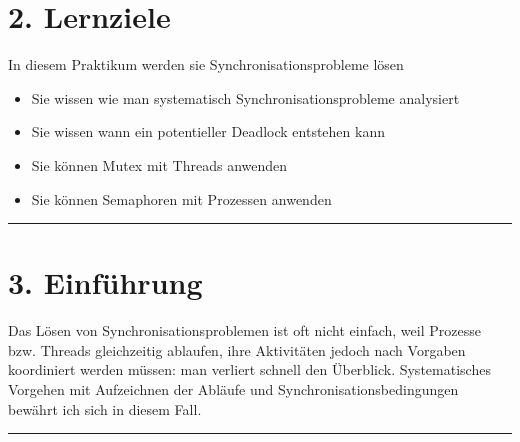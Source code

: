\documentclass[a4paper,10pt,english]{report}
\begin{document}
\section{2. Lernziele}
\label{\detokenize{P08_Sync/README:lernziele}}
\sphinxAtStartPar
In diesem Praktikum werden sie Synchronisationsprobleme lösen
\begin{itemize}
\item {} 
\sphinxAtStartPar
Sie wissen wie man systematisch Synchronisationsprobleme analysiert

\item {} 
\sphinxAtStartPar
Sie wissen wann ein potentieller Deadlock entstehen kann

\item {} 
\sphinxAtStartPar
Sie können Mutex mit Threads anwenden

\item {} 
\sphinxAtStartPar
Sie können Semaphoren mit Prozessen anwenden

\end{itemize}


\bigskip\hrule\bigskip



\section{3. Einführung}
\label{\detokenize{P08_Sync/README:einfuhrung}}
\sphinxAtStartPar
Das Lösen von Synchronisationsproblemen ist oft nicht einfach, weil Prozesse bzw. Threads gleichzeitig ablaufen, ihre Aktivitäten jedoch nach Vorgaben koordiniert werden müssen: man verliert schnell den Überblick. Systematisches Vorgehen mit Aufzeichnen der Abläufe und Synchronisationsbedingungen bewährt ich sich in diesem Fall.


\bigskip\hrule\bigskip
\end{document}
